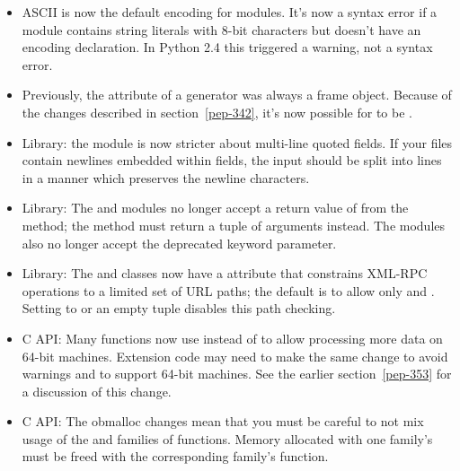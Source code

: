 \documentclass{howto}
\begin{document}
\begin{itemize}

\item ASCII is now the default encoding for modules.  It's now 
a syntax error if a module contains string literals with 8-bit
characters but doesn't have an encoding declaration.  In Python 2.4
this triggered a warning, not a syntax error.

\item Previously, the  attribute of a generator
was always a frame object.  Because of the  changes
described in section~\ref{pep-342}, it's now possible
for  to be .

\item Library: the  module is now stricter about multi-line quoted
fields.  If your files contain newlines embedded within fields, the
input should be split into lines in a manner which preserves the
newline characters.

\item Library: The  and  modules no
longer accept a return value of  from the
 method; the method must return a tuple of
arguments instead.  The modules also no longer accept the deprecated
 keyword parameter.

\item Library: The  and  
classes now have a  attribute that constrains
XML-RPC operations to a limited set of URL paths; the default is
to allow only  and .  Setting 
 to  or an empty tuple disables 
this path checking.

\item C API: Many functions now use  
instead of  to allow processing more data on 64-bit
machines.  Extension code may need to make the same change to avoid
warnings and to support 64-bit machines.  See the earlier
section~\ref{pep-353} for a discussion of this change.

\item C API: 
The obmalloc changes mean that 
you must be careful to not mix usage 
of the  and 
families of functions. Memory allocated with 
one family's  must be 
freed with the corresponding family's  function.

\end{itemize}
\end{document}
